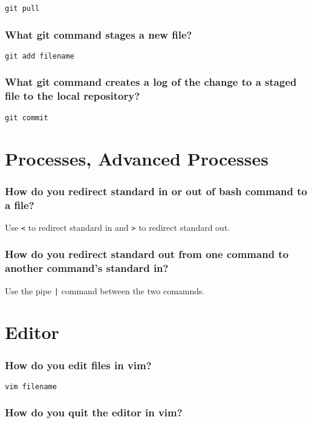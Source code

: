 \documentclass{article}
\newcommand{\inlinecode}[1]{\colorbox{gray!20}{\texttt{#1}}}
\begin{document}
\inlinecode{git pull}

\subsubsection*{What git command stages a new file?}

\inlinecode{git add filename}

\subsubsection*{What git command creates a log of the change to a staged file to the local repository?}

\inlinecode{git commit}

\section*{Processes, Advanced Processes}

\subsubsection*{How do you redirect standard in or out of bash command to a file?}

Use \inlinecode{<} to redirect standard in and \inlinecode{>} to redirect standard out.

\subsubsection*{How do you redirect standard out from one command to another command's standard in?}

Use the pipe \inlinecode{|} command between the two comamnds.

\section*{Editor}

\subsubsection*{How do you edit files in vim?}

\inlinecode{vim filename}

\subsubsection*{How do you quit the editor in vim?}
\end{document}
